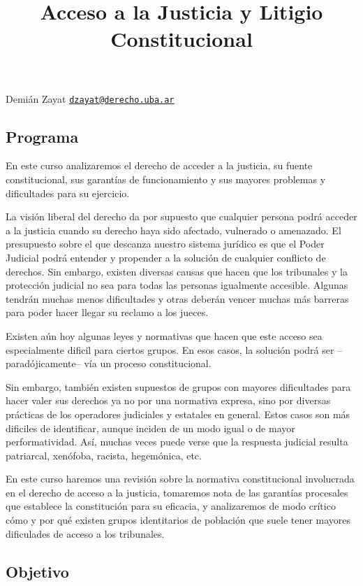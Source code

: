 \documentclass[
]{article}
\title{Acceso a la Justicia y Litigio Constitucional}
\author{}
\date{\vspace{-2.5em}}
\begin{document}
\maketitle

Demián Zayat
\href{mailto:dzayat@derecho.uba.ar}{\nolinkurl{dzayat@derecho.uba.ar}}

\subsection{Programa}\label{programa}

En este curso analizaremos el derecho de acceder a la justicia, su
fuente constitucional, sus garantías de funcionamiento y sus mayores
problemas y dificultades para su ejercicio.

La visión liberal del derecho da por supuesto que cualquier persona
podrá acceder a la justicia cuando su derecho haya sido afectado,
vulnerado o amenazado. El presupuesto sobre el que descanza nuestro
sistema jurídico es que el Poder Judicial podrá entender y propender a
la solución de cualquier conflicto de derechos. Sin embargo, existen
diversas causas que hacen que los tribunales y la protección judicial no
sea para todas las personas igualmente accesible. Algunas tendrán muchas
menos dificultades y otras deberán vencer muchas más barreras para poder
hacer llegar su reclamo a los jueces.

Existen aún hoy algunas leyes y normativas que hacen que este acceso sea
especialmente dificil para ciertos grupos. En esos casos, la solución
podrá ser --paradójicamente-- vía un proceso constitucional.

Sin embargo, también existen supuestos de grupos con mayores
dificultades para hacer valer sus derechos ya no por una normativa
expresa, sino por diversas prácticas de los operadores judiciales y
estatales en general. Estos casos son más dificiles de identificar,
aunque inciden de un modo igual o de mayor performatividad. Así, muchas
veces puede verse que la respuesta judicial resulta patriarcal,
xenófoba, racista, hegemónica, etc.

En este curso haremos una revisión sobre la normativa constitucional
involucrada en el derecho de acceso a la justicia, tomaremos nota de las
garantías procesales que establece la constitución para su eficacia, y
analizaremos de modo crítico cómo y por qué existen grupos identitarios
de población que suele tener mayores dificulades de acceso a los
tribunales.

\subsection{Objetivo}\label{objetivo}
\end{document}
